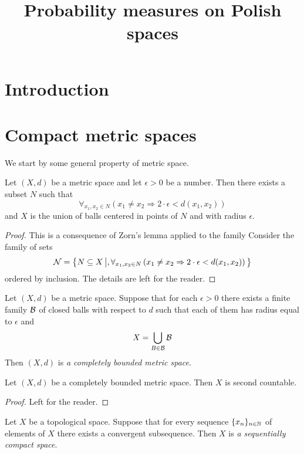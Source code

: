 



\title{Probability measures on Polish spaces}
\date{}
\maketitle

\section{Introduction}

\section{Compact metric spaces}
\noindent
We start by some general property of metric space.

\begin{fact}\label{fact:largest_epsilon_net}
Let $(X,d)$ be a metric space and let $\epsilon > 0$ be a number. Then there exists a subset $N$ such that
$$\forall_{x_1,x_2\in N}\left(x_1\neq x_2 \Rightarrow 2\cdot \epsilon < d(x_1,x_2)\right)$$
and $X$ is the union of balls centered in points of $N$ and with radius $\epsilon$.
\end{fact}
\begin{proof}
This is a consequence of Zorn's lemma applied to the family
Consider the family of sets
$${\mathcal N} = \big\{N \subseteq X\,\big|,\forall_{x_1,x_2\in N}\left(x_1\neq x_2 \Rightarrow 2\cdot \epsilon < d(x_1,x_2)\right)\big\}$$
ordered by inclusion. The details are left for the reader.
\end{proof}

\begin{definition}
Let $(X,d)$ be a metric space. Suppose that for each $\epsilon > 0$ there exists a finite family ${\mathcal B}$ of closed balls with respect to $d$ such that each of them has radius equal to $\epsilon$ and
$$X =  \bigcup_{B\in {\mathcal B}} {\mathcal B}$$
Then $(X,d)$ is \textit{a completely bounded metric space}.
\end{definition}

\begin{fact}\label{fact:completely_bounded_is_second_countable}
Let $(X,d)$ be a completely bounded metric space. Then $X$ is second countable.
\end{fact}
\begin{proof}
Left for the reader.
\end{proof}

\begin{definition}
Let $X$ be a topological space. Suppose that for every sequence $\{x_n\}_{n\in {\mathbb N}}$ of elements of $X$ there exists a convergent subsequence. Then $X$ is \textit{a sequentially compact space}.
\end{definition}


